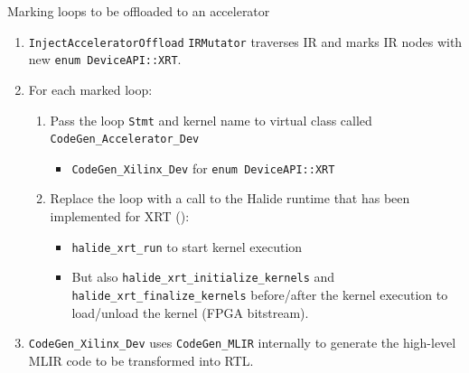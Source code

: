 \documentclass[8pt,a4paper,oneside,hidelinks,aspectratio=169,dvipsnames]{beamer}
\newcommand{\code}[1]{\texttt{\detokenize{#1}}}
\newcommand{\codecpp}[1]{\texttt{#1}}
\begin{document}
\begin{frame}{Marking loops to be offloaded to an accelerator}
  \begin{enumerate}
    \item \codecpp{InjectAcceleratorOffload} \codecpp{IRMutator} traverses IR and marks \code{For} IR nodes with new \codecpp{enum DeviceAPI::XRT}.
    \item For each marked \code{For} loop:
          \begin{enumerate}
            \item Pass the loop \codecpp{Stmt} and kernel name to virtual class called \codecpp{CodeGen_Accelerator_Dev}
                  \begin{itemize}
                    \item \codecpp{CodeGen_Xilinx_Dev} for \codecpp{enum DeviceAPI::XRT}
                  \end{itemize}
            \item Replace the loop with a call to the Halide runtime that has been implemented for XRT (\code{xrt.cpp}):
                  \begin{itemize}
                    \item \codecpp{halide_xrt_run} to start kernel execution
                    \item But also \codecpp{halide_xrt_initialize_kernels} and \codecpp{halide_xrt_finalize_kernels} before/after the kernel execution to load/unload the kernel (FPGA bitstream).
                  \end{itemize}
          \end{enumerate}
    \item \codecpp{CodeGen_Xilinx_Dev} uses \codecpp{CodeGen_MLIR} internally to generate the high-level MLIR code to be transformed into RTL.
  \end{enumerate}
\end{frame}
\end{document}
